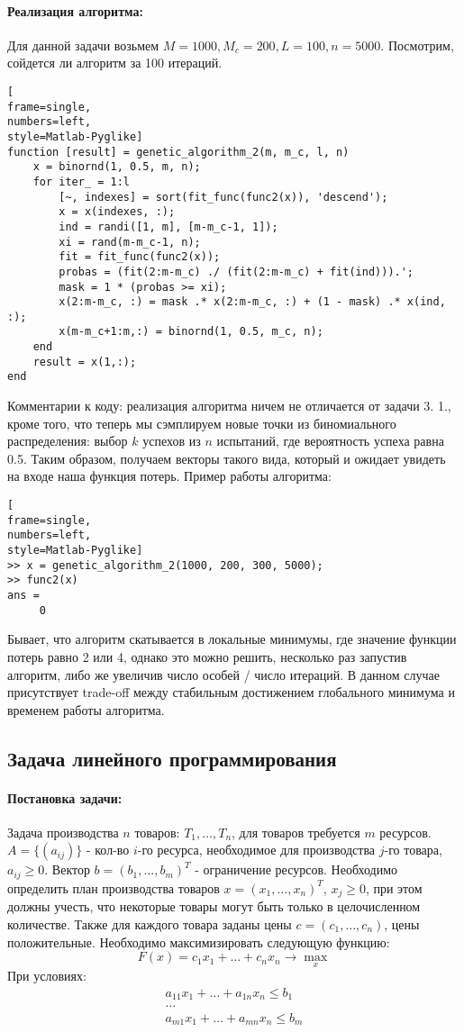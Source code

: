 \documentclass[12pt]{article}
\begin{document}
\paragraph{Реализация алгоритма:} Для данной задачи возьмем $M = 1000, M_c = 200, L = 100, n = 5000$. Посмотрим, сойдется ли алгоритм за 100 итераций. 
\begin{lstlisting}[
frame=single,
numbers=left,
style=Matlab-Pyglike]
function [result] = genetic_algorithm_2(m, m_c, l, n)
    x = binornd(1, 0.5, m, n);
    for iter_ = 1:l
        [~, indexes] = sort(fit_func(func2(x)), 'descend');
        x = x(indexes, :);
        ind = randi([1, m], [m-m_c-1, 1]);
        xi = rand(m-m_c-1, n);
        fit = fit_func(func2(x));
        probas = (fit(2:m-m_c) ./ (fit(2:m-m_c) + fit(ind))).';
        mask = 1 * (probas >= xi);
        x(2:m-m_c, :) = mask .* x(2:m-m_c, :) + (1 - mask) .* x(ind, :);
        x(m-m_c+1:m,:) = binornd(1, 0.5, m_c, n);
    end
    result = x(1,:);
end
\end{lstlisting}
Комментарии к коду: реализация алгоритма ничем не отличается от задачи 3. 1., кроме того, что теперь мы сэмплируем новые точки из биномиального распределения: выбор $k$ успехов из $n$ испытаний, где вероятность успеха равна 0.5. Таким образом, получаем векторы такого вида, который и ожидает увидеть на входе наша функция потерь. 
Пример работы алгоритма:
\begin{lstlisting}[
frame=single,
numbers=left,
style=Matlab-Pyglike]
>> x = genetic_algorithm_2(1000, 200, 300, 5000);
>> func2(x)
ans =
     0
\end{lstlisting}
Бывает, что алгоритм скатывается в локальные минимумы, где значение функции потерь равно 2 или 4, однако это можно решить, несколько раз запустив алгоритм, либо же увеличив число особей / число итераций. В данном случае присутствует trade-off между стабильным достижением глобального минимума и временем работы алгоритма. 
\subsection{Задача линейного программирования}
\paragraph{Постановка задачи:} Задача производства $n$ товаров: $T_1, \dots, T_n$, для товаров требуется $m$ ресурсов. $A = \{(a_{ij})\}$ - кол-во $i$-го ресурса, необходимое для производства $j$-го товара, $a_{ij} \geq 0$. Вектор $b = (b_1, \dots, b_m)^T$ - ограничение ресурсов. Необходимо определить план производства товаров $x = (x_1, \dots, x_n)^T$, $x_{j} \geq 0$, при этом должны учесть, что некоторые товары могут быть только в целочисленном количестве. Также для каждого товара заданы цены $c = (c_1, \dots, c_n)$, цены положительные. Необходимо максимизировать следующую функцию:
$$
F(x) = c_1 x_1 + \dots + c_n x_n \to \max_x
$$
При условиях:
\begin{gather*}
	a_{11} x_1 + \dots + a_{1n} x_n \leq b_1 \\
	\dots \\
	a_{m1} x_1 + \dots + a_{mn} x_n \leq b_m
\end{gather*}
\end{document}
